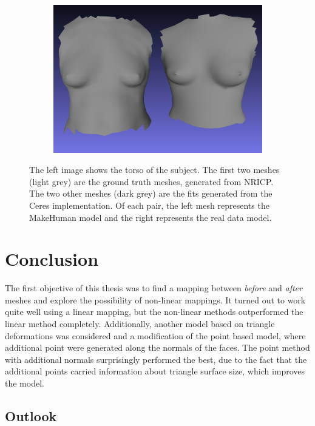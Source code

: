 \begin{figure}
\begin{subfigure}{.37\textwidth}
  \centering
  \includegraphics[width=1.1\linewidth]{figures/before57_cropped}
\end{subfigure}
\caption[Comparison image, fitted and ICP]{The left image shows the torso of the subject. The first two meshes (light grey) are the ground truth meshes, generated from NRICP. The two other meshes (dark grey) are the fits generated from the Ceres implementation. Of each pair, the left mesh represents the MakeHuman model and the right represents the real data model.}
\label{fig:compimagefiticp}
\end{figure}

\chapter{Conclusion}
The first objective of this thesis was to find a mapping between \textit{before} and \textit{after} meshes and explore the possibility of non-linear mappings. It turned out to work quite well using a linear mapping, but the non-linear methods outperformed the linear method completely. Additionally, another model based on triangle deformations was considered and a modification of the point based model, where additional point were generated along the normals of the faces. The point method with additional normals surprisingly performed the best, due to the fact that the additional points carried information about triangle surface size, which improves the model. 



\section{Outlook}
